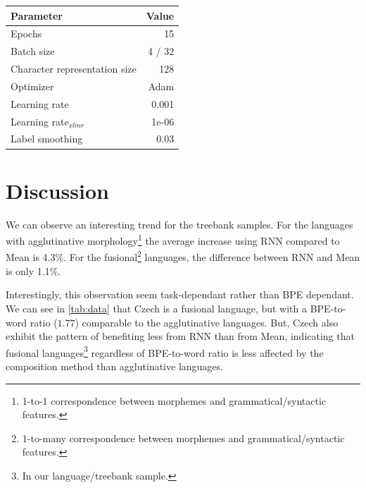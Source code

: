 \documentclass[11pt]{article}
\begin{document}
\begin{table}[h]
	\centering
	\begin{tabular}{lr}
		Parameter & Value \\
		\hline
		Epochs & 15 \\
		Batch size & 4 / 32 \\
		Character representation size & 128 \\
		Optimizer & Adam \\
		Learning rate & 0.001 \\
		Learning rate$_{xlmr}$ & 1e-06 \\
		Label smoothing & 0.03 \\
		
	\end{tabular}
\end{table}

	
	
	\section{Discussion}
        We can observe an interesting trend for the treebank samples. For the languages with agglutinative morphology\footnote{1-to-1 correspondence between morphemes and grammatical/syntactic features.} the average increase using RNN compared to Mean is 4.3\%. For the fusional\footnote{1-to-many correspondence between morphemes and grammatical/syntactic features.} languages, the difference between RNN and Mean is only 1.1\%. 
        
        Interestingly, this observation seem task-dependant rather than BPE dependant. We can see in \cref{tab:data} that Czech is a fusional language, but with a BPE-to-word ratio ($1.77$) comparable to the agglutinative languages. But, Czech also exhibit the pattern of benefiting less from RNN than from Mean, indicating that fusional languages\footnote{In our language/treebank sample.} regardless of BPE-to-word ratio is less affected by the composition method than agglutinative languages. 
        
        
	
	
	
	
	
	
\end{document}
